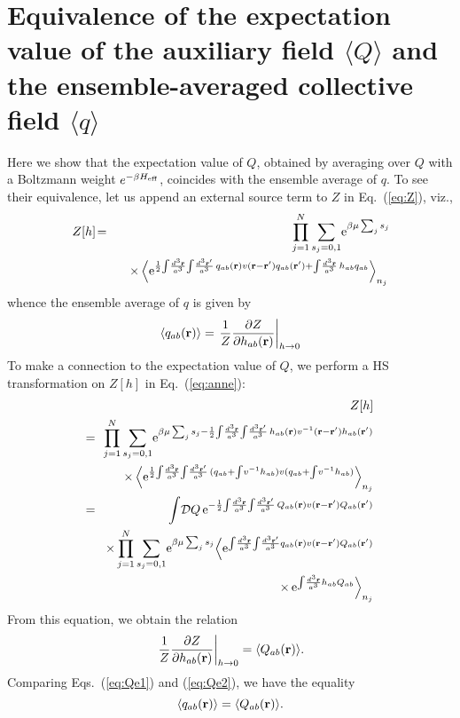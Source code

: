 \documentclass[jcp,aps,twocolumn,showpacs,supergroupedaddress,epsfig,amsmath,amssymb,eqsecnum]{revtex4}
\newcommand{\be}{\begin{equation}}
\newcommand{\ee}{\end{equation}}
\newcommand{\ba}{\begin{eqnarray}}
\newcommand{\ea}{\end{eqnarray}}
\newcommand{\rv}{{\bf r}}
\begin{document}
\section{Equivalence of the expectation value of the auxiliary field $\langle Q \rangle$ and the ensemble-averaged collective field $\langle q \rangle$}
\label{app:Q}

Here we show that the expectation value of $Q$, obtained by averaging over $Q$ with a Boltzmann weight $e^{-\beta H_{{\rm eff}}}$, coincides with the ensemble average of $q$.
To see their equivalence, let us append an external source term to $Z$ in Eq.~(\ref{eq:Z}), viz., 
\ba
\label{eq:anne}
Z[h] &\!=\!& \prod_{j=1}^{N} \sum_{s_j=0,1} \! {\rm e}^{\beta \mu \sum_j s_j} \! 
\\
&&\quad \times \, 
\Big\langle 
{\rm e}^{\frac{1}{2} \!\int\! \frac{d^3\rv}{a^3} \! \int \! \frac{d^3\rv'}{a^3} \, 
q_{ab}(\rv) v(\rv - \rv') q_{ab}(\rv') + \int \! \frac{d^3\rv}{a^3} \, h_{ab} q_{ab}}
\Big\rangle_{n_j}
\nonumber
\ea
whence the ensemble average of $q$ is given by
\be
\label{eq:Qe1}
\langle q_{ab}(\rv) \rangle = \left.\frac{1}{Z}\frac{\partial Z}{\partial h_{ab}(\rv)}\right|_{h\rightarrow 0}
\ee
To make a connection to the expectation value of $Q$, we perform a HS transformation on $Z[h]$ in Eq.~(\ref{eq:anne}): 
\ba
&&Z[h]
\\
&\!\!=\!\!&
\prod_{j=1}^{N} \sum_{s_j=0,1} \! {\rm e}^{\beta \mu \sum_j s_j - \frac{1}{2}  \!\int\! \frac{d^3\rv}{a^3} \! \int \! \frac{d^3\rv'}{a^3} \, h_{ab}(\rv) v^{-1}(\rv - \rv') h_{ab}(\rv')}
\nonumber\\ 
&&\quad \times \, 
\Big\langle 
{\rm e}^{\frac{1}{2} \!\int\! \frac{d^3\rv}{a^3} \! \int \! \frac{d^3\rv'}{a^3} \, 
(q_{ab} + \int \! v^{-1} h_{ab}) v (q_{ab} + \int \! v^{-1} h_{ab})}
\Big\rangle_{n_j}
\nonumber\\ 
&\!\!=\!\!& \int\!\mathcal{D}Q \, 
{\rm e}^{-\frac{1}{2} \!\int\! \frac{d^3\rv}{a^3} \! \int \! \frac{d^3\rv'}{a^3} \, 
Q_{ab}(\rv) v(\rv - \rv') Q_{ab}(\rv')}
\nonumber\\
&&\times
\prod_{j=1}^{N} 
\sum_{s_j=0,1} \! 
{\rm e}^{\beta \mu \sum_{j} s_j} 
\Big\langle {\rm e}^{\int \!\frac{d^3\rv}{a^3} \! \int \!\frac{d^3\rv'}{a^3} q_{ab}(\rv) v(\rv-\rv') Q_{ab}(\rv')}
\nonumber\\
&&\qquad\qquad\times\,
{\rm e}^{\int\!\frac{d^3\rv}{a^3} h_{ab} Q_{ab}}
\Big\rangle_{n_j}
\nonumber
\ea
From this equation, we obtain the relation
\be
\label{eq:Qe2}
 \left.\frac{1}{Z}\frac{\partial Z}{\partial h_{ab}(\rv)}\right|_{h\rightarrow 0}
= \langle Q_{ab}(\rv) \rangle.
\ee
Comparing Eqs.~(\ref{eq:Qe1}) and (\ref{eq:Qe2}), we have the equality 
\be
\label{eq:dualrelation}
\langle q_{ab}(\rv) \rangle = \langle Q_{ab}(\rv) \rangle. 
\ee
\end{document}
